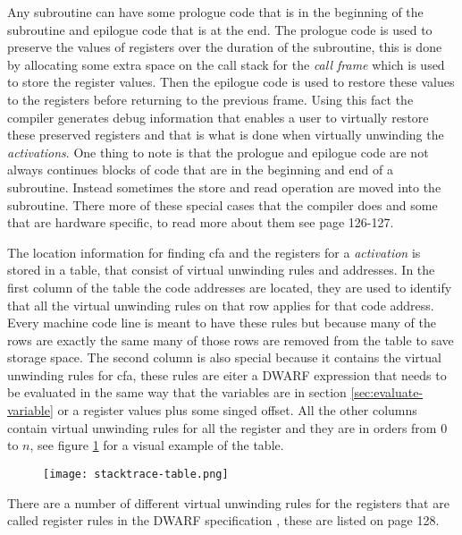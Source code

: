 Any subroutine can have some prologue code that is in the beginning of the subroutine  and epilogue code that is at the end.
The prologue code is used to preserve the values of registers over the duration of the subroutine, this is done by allocating some extra space on the call stack for the \emph{call frame} which is used to store the register values.
Then the epilogue code is used to restore these values to the registers before returning to the previous frame.
Using this fact the compiler generates debug information that enables a user to virtually restore these preserved registers and that is what is done when virtually unwinding the \emph{activations}.
One thing to note is that the prologue and epilogue code are not always continues blocks of code that are in the beginning and end of a subroutine.
Instead sometimes the store and read operation are moved into the subroutine.
There more of these special cases that the compiler does and some that are hardware specific, to read more about them see \cite{DWARF} page 126-127.

The location information for finding \gls{cfa} and the registers for a \emph{activation} is stored in a table, that consist of virtual unwinding rules and addresses.
In the first column of the table the code addresses are located, they are used to identify that all the virtual unwinding rules on that row applies for that code address.
Every machine code line is meant to have these rules but because many of the rows are exactly the same many of those rows are removed from the table to save storage space.
The second column is also special because it contains the virtual unwinding rules for \gls{cfa}, these rules are eiter a \gls{DWARF} expression that needs to be evaluated in the same way that the variables are in section \ref{sec:evaluate-variable} or a register values plus some singed offset.
All the other columns contain virtual unwinding rules for all the register and they are in orders from $0$ to $n$, see figure \ref{fig:stacktracetable} for a visual example of the table.


\begin{figure}[h]
    \centering
    \texttt{[image: stacktrace-table.png]}
    \label{fig:stacktracetable}
\end{figure}


There are a number of different virtual unwinding rules for the registers that are called register rules in the \gls{DWARF} specification \cite{DWARF}, these are listed on page 128.


